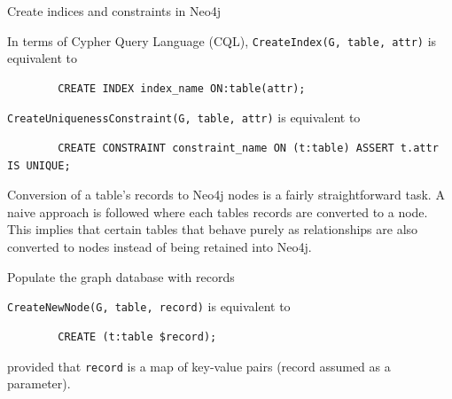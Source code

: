 \documentclass[12pt]{article}
\begin{document}
    \begin{algorithm}[htb!]
        \SetAlgoLined
        \label{algo:sql_create_index}
        \caption{Create indices and constraints in Neo4j}
    \end{algorithm}

    In terms of Cypher Query Language (CQL), \verb|CreateIndex(G, table, attr)| is equivalent to 
    \begin{lstlisting}
        CREATE INDEX index_name ON:table(attr);
    \end{lstlisting}
    \verb|CreateUniquenessConstraint(G, table, attr)| is equivalent to 
    \begin{lstlisting}
        CREATE CONSTRAINT constraint_name ON (t:table) ASSERT t.attr IS UNIQUE;
    \end{lstlisting}

    Conversion of a table's records to Neo4j nodes is a fairly straightforward task. A naive approach is followed where each tables records are converted to a node. This implies that certain tables that behave purely as relationships are also converted to nodes instead of being retained into Neo4j.

    \begin{algorithm}[htb!]
        \SetAlgoLined
        \label{algo:sql2graph}
        \caption{Populate the graph database with records}
    \end{algorithm}

    \verb|CreateNewNode(G, table, record)| is equivalent to 
    \begin{lstlisting}
        CREATE (t:table $record);
    \end{lstlisting}
    provided that \verb|record| is a map of key-value pairs (record assumed as a parameter).
\end{document}
